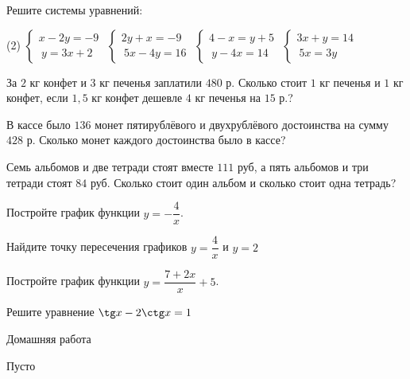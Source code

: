 \begin{class}[number=3]
	\begin{listofex}
		\item Решите системы уравнений:
		\begin{tasks}(2)
			\task \( \begin{cases}
				x-2y=-9\\\ y=3x+2
			\end{cases} \)
			\task \( \begin{cases}
				2y+x=-9\\\ 5x-4y=16
			\end{cases} \)
			\task \( \begin{cases}
				4-x=y+5\\\ y-4x=14
			\end{cases} \)
			\task \( \begin{cases}
				3x+y=14\\\ 5x=3y
			\end{cases} \)
		\end{tasks}
		\item  За \( 2 \) кг конфет и \( 3 \) кг печенья заплатили \( 480 \) р. Сколько стоит \( 1 \) кг печенья и \( 1 \) кг конфет, если \( 1,5 \) кг конфет дешевле \( 4 \) кг печенья на \( 15 \) р.?
		\item  В кассе было \( 136 \) монет пятирублёвого и  двухрублёвого достоинства на сумму \( 428 \) р. Сколько монет каждого достоинства было в кассе?
		\item Семь альбомов и две тетради стоят вместе \( 111 \) руб, а пять альбомов и три тетради стоят \( 84 \) руб. Сколько стоит один альбом и сколько стоит одна тетрадь?
		\item Постройте график функции \( y=-\dfrac{4}{x} \).
		\item Найдите точку пересечения графиков \( y=\dfrac{4}{x} \) и \( y=2 \) 
		\item Постройте график функции \( y = \dfrac{7+2x}{x}+5 \).
		\item  Решите уравнение \( \tg x-2\ctg x=1 \)
	\end{listofex}
\end{class}

\begin{homework}[number=3]
	\begin{listofex}
		\item Домашняя работа
	\end{listofex}
\end{homework}

\begin{class}[number=4]
	\begin{listofex}
		\item Пусто
	\end{listofex}
\end{class}
